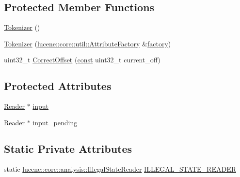 \subsection*{Protected Member Functions}
\begin{DoxyCompactItemize}
\item 
\mbox{\hyperlink{classlucene_1_1core_1_1analysis_1_1Tokenizer_a2a6c04ea8c784f66bebcb6df7073769c}{Tokenizer}} ()
\item 
\mbox{\hyperlink{classlucene_1_1core_1_1analysis_1_1Tokenizer_a88b02b1592e51baa95cd41090183ee8b}{Tokenizer}} (\mbox{\hyperlink{classlucene_1_1core_1_1util_1_1AttributeFactory}{lucene\+::core\+::util\+::\+Attribute\+Factory}} \&\mbox{\hyperlink{classlucene_1_1core_1_1util_1_1AttributeSource_a1376420a752f337a0fdb582bdf160eba}{factory}})
\item 
uint32\+\_\+t \mbox{\hyperlink{classlucene_1_1core_1_1analysis_1_1Tokenizer_a4c10a2cdbd688233cddb87151a8bf168}{Correct\+Offset}} (\mbox{\hyperlink{ZlibCrc32_8h_a2c212835823e3c54a8ab6d95c652660e}{const}} uint32\+\_\+t current\+\_\+off)
\end{DoxyCompactItemize}
\subsection*{Protected Attributes}
\begin{DoxyCompactItemize}
\item 
\mbox{\hyperlink{classlucene_1_1core_1_1analysis_1_1Reader}{Reader}} $\ast$ \mbox{\hyperlink{classlucene_1_1core_1_1analysis_1_1Tokenizer_a376df6bd42b18d1175168b9529b7665e}{input}}
\item 
\mbox{\hyperlink{classlucene_1_1core_1_1analysis_1_1Reader}{Reader}} $\ast$ \mbox{\hyperlink{classlucene_1_1core_1_1analysis_1_1Tokenizer_ac968137c9d44ef57a69c8df4e6e628ff}{input\+\_\+pending}}
\end{DoxyCompactItemize}
\subsection*{Static Private Attributes}
\begin{DoxyCompactItemize}
\item 
static \mbox{\hyperlink{classlucene_1_1core_1_1analysis_1_1IllegalStateReader}{lucene\+::core\+::analysis\+::\+Illegal\+State\+Reader}} \mbox{\hyperlink{classlucene_1_1core_1_1analysis_1_1Tokenizer_a8ddffe6457c8764f4a14326449a42abc}{I\+L\+L\+E\+G\+A\+L\+\_\+\+S\+T\+A\+T\+E\+\_\+\+R\+E\+A\+D\+ER}}
\end{DoxyCompactItemize}
